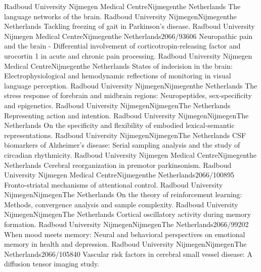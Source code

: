 	{Radboud University Nijmegen Medical Centre}{Nijmegen}{the Netherlands}{}
	{The language networks of the brain.}
	{Radboud University Nijmegen}{Nijmegen}{the Netherlands}{}
	{Tackling freezing of gait in Parkinson's disease.}
	{Radboud University Nijmegen Medical Centre}{Nijmegen}{the Netherlands}{2066/93606}
	{Neuropathic pain and the brain - Differential involvement of corticotropin-releasing factor and urocortin 1 in acute and chronic pain processing.}
	{Radboud University Nijmegen Medical Centre}{Nijmegen}{the Netherlands}{}
	{States of indecision in the brain: Electrophysiological and hemodynamic reflections of monitoring in visual language perception.}
	{Radboud University Nijmegen}{Nijmegen}{the Netherlands}{}
	{The stress response of forebrain and midbrain regions: Neuropeptides, sex-specificity and epigenetics.}
	{Radboud University Nijmegen}{Nijmegen}{The Netherlands}{}
	{Representing action and intention.}
	{Radboud University Nijmegen}{Nijmegen}{The Netherlands}{}
	{On the specificity and flexibility of embodied lexical-semantic representations.}
	{Radboud University Nijmegen}{Nijmegen}{The Netherlands}{}
	{ CSF biomarkers of Alzheimer’s disease: Serial sampling analysis and the study of circadian rhythmicity.}
	{Radboud University Nijmegen Medical Centre}{Nijmegen}{the Netherlands}{}
	{Cerebral reorganization in premotor parkinsonism.}
	{Radboud University Nijmegen Medical Centre}{Nijmegen}{the Netherlands}{2066/100895}
	{Fronto-striatal mechanisms of attentional control.}
	{Radboud University Nijmegen}{Nijmegen}{The Netherlands}{}
	{On the theory of reinforcement learning: Methods, convergence analysis and sample complexity.}
	{Radboud University Nijmegen}{Nijmegen}{The Netherlands}{}
	{Cortical oscillatory activity during memory formation.}
	{Radboud University Nijmegen}{Nijmegen}{The Netherlands}{2066/99202}
	{When mood meets memory: Neural and behavioral perspectives on emotional memory in health and depression.}
	{Radboud University Nijmegen}{Nijmegen}{The Netherlands}{2066/105840}
	{Vascular risk factors in cerebral small vessel disease: A diffusion tensor imaging study.}
